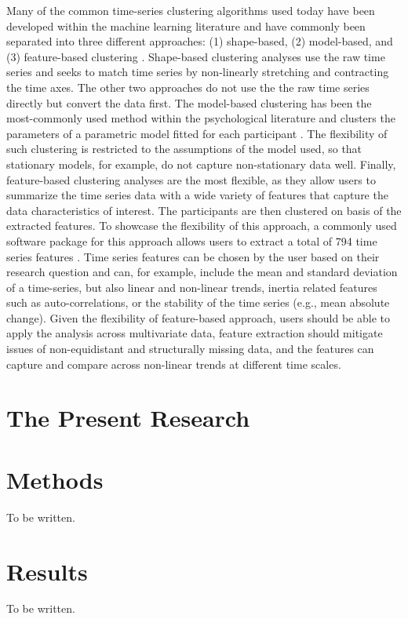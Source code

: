 \documentclass[man, 12pt, a4paper]{apa7}
\theoremstyle{break}
\theoremstyle{plain}
\begin{document}
Many of the common time-series clustering algorithms used today have been developed within the machine learning literature and have commonly been separated into three different approaches: (1) shape-based, (2) model-based, and (3) feature-based clustering \citep{hautamaki2008, liao2005}. Shape-based clustering analyses use the raw time series and seeks to match time series by non-linearly stretching and contracting the time axes. The other two approaches do not use the the raw time series directly but convert the data first. The model-based clustering has been the most-commonly used method within the psychological literature and clusters the parameters of a parametric model fitted for each participant \citep[e.g.,][]{ernst2021}. The flexibility of such clustering is restricted to the assumptions of the model used, so that stationary models, for example, do not capture non-stationary data well. Finally, feature-based clustering analyses are the most flexible, as they allow users to summarize the time series data with a wide variety of features that capture the data characteristics of interest. The participants are then clustered on basis of the extracted features. To showcase the flexibility of this approach, a commonly used software package for this approach allows users to extract a total of 794 time series features \citep[][]{christ2018}. Time series features can be chosen by the user based on their research question and can, for example, include the mean and standard deviation of a time-series, but also linear and non-linear trends, inertia related features such as auto-correlations, or the stability of the time series (e.g., mean absolute change). Given the flexibility of feature-based approach, users should be able to apply the analysis across multivariate data, feature extraction should mitigate issues of non-equidistant and structurally missing data, and the features can capture and compare across non-linear trends at different time scales.

\section{The Present Research}

%
\section{Methods}
To be written.

\section{Results}
To be written.
\end{document}
